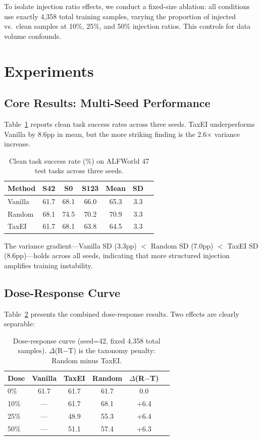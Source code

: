 \documentclass[11pt,a4paper]{article}
\begin{document}
To isolate injection ratio effects, we conduct a fixed-size ablation: all conditions use exactly 4,358 total training samples, varying the proportion of injected vs.\ clean samples at 10\%, 25\%, and 50\% injection ratios. This controls for data volume confounds.

\section{Experiments}

\subsection{Core Results: Multi-Seed Performance}
\label{sec:core}

Table~\ref{tab:core} reports clean task success rates across three seeds. TaxEI underperforms Vanilla by 8.6pp in mean, but the more striking finding is the 2.6$\times$ variance increase.

\begin{table}[t]
\centering
\small
\begin{tabular}{lcccccc}
\toprule
\textbf{Method} & \textbf{S42} & \textbf{S0} & \textbf{S123} & \textbf{Mean} & \textbf{SD} \\
\midrule
Vanilla & 61.7 & 68.1 & 66.0 & 65.3 & 3.3 \\
Random  & 68.1 & 74.5 & 70.2 & 70.9 & 3.3 \\
TaxEI   & 61.7 & 68.1 & 63.8 & 64.5 & 3.3 \\
\bottomrule
\end{tabular}
\caption{Clean task success rate (\%) on ALFWorld 47 test tasks across three seeds.}
\label{tab:core}
\end{table}

The variance gradient---Vanilla SD (3.3pp) $<$ Random SD (7.0pp) $<$ TaxEI SD (8.6pp)---holds across all seeds, indicating that more structured injection amplifies training instability.

\subsection{Dose-Response Curve}
\label{sec:dose}

Table~\ref{tab:dose} presents the combined dose-response results. Two effects are clearly separable:

\begin{table}[t]
\centering
\small
\begin{tabular}{lccccc}
\toprule
\textbf{Dose} & \textbf{Vanilla} & \textbf{TaxEI} & \textbf{Random} & \textbf{$\Delta$(R$-$T)} \\
\midrule
0\%  & 61.7 & 61.7 & 61.7 & 0.0 \\
10\% & ---  & 61.7 & 68.1 & +6.4 \\
25\% & ---  & 48.9 & 55.3 & +6.4 \\
50\% & ---  & 51.1 & 57.4 & +6.3 \\
\bottomrule
\end{tabular}
\caption{Dose-response curve (seed=42, fixed 4,358 total samples). $\Delta$(R$-$T) is the taxonomy penalty: Random minus TaxEI.}
\label{tab:dose}
\end{table}
\end{document}
